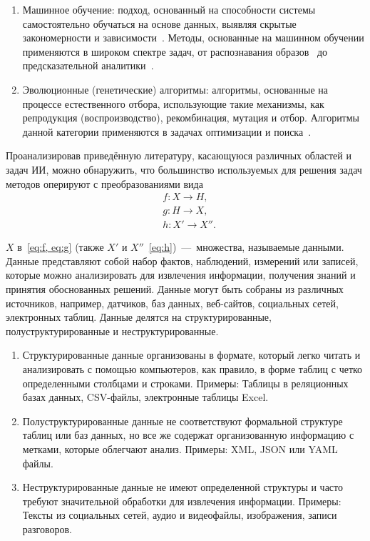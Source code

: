 \begin{itemize}[leftmargin=2.5em, label=\textbullet]
\begin{enumerate}[leftmargin=2.5em]
        \item Машинное обучение: подход, основанный на способности системы самостоятельно обучаться на основе данных, выявляя скрытые закономерности и зависимости~\cite{joshi, brink, vorontsov, wolf, muller, sarkerml}. Методы, основанные на машинном обучении применяются в широком спектре задач, от распознавания образов~\cite{bishop, singh, fieguth, braga-neto} до предсказательной аналитики~\cite{sghir, sharma, manasa, vjugin}.
        \item Эволюционные (генетические) алгоритмы: алгоритмы, основанные на процессе естественного отбора, использующие такие механизмы, как репродукция (воспроизводство), рекомбинация, мутация и отбор. Алгоритмы данной категории применяются в задачах оптимизации и поиска~\cite{alhijawi, katoch, khan, whitley, dejong, fraser1, fraser2, baricelli57, baricelli62}.
    \end{enumerate}
\end{itemize}

Проанализировав приведённую литературу, касающуюся различных областей и задач ИИ, можно обнаружить, что большинство используемых для решения задач методов оперируют с преобразованиями вида\begin{align}
    & f : X \to H, \label{eq:f} \\ 
    & g : H \to X, \label{eq:g} \\
    & h : X' \to X''. \label{eq:h}
\end{align}

$X$ в~\cref{eq:f, eq:g} (также $X'$ и $X''$~\cref{eq:h})~---~множества, называемые данными. Данные представляют собой набор фактов, наблюдений, измерений или записей, которые можно анализировать для извлечения информации, получения знаний и принятия обоснованных решений. Данные могут быть собраны из различных источников, например, датчиков, баз данных, веб-сайтов, социальных сетей, электронных таблиц. Данные делятся на структурированные, полуструктурированные и неструктурированные. \begin{enumerate}
    \item Структурированные данные организованы в формате, который легко читать и анализировать с помощью компьютеров, как правило, в форме таблиц с четко определенными столбцами и строками. Примеры: Таблицы в реляционных базах данных, CSV-файлы, электронные таблицы Excel.
    \item Полуструктурированные данные не соответствуют формальной структуре таблиц или баз данных, но все же содержат организованную информацию с метками, которые облегчают анализ. Примеры: XML, JSON или YAML файлы.
    \item Неструктурированные данные не имеют определенной структуры и часто требуют значительной обработки для извлечения информации. Примеры: Тексты из социальных сетей, аудио и видеофайлы, изображения, записи разговоров.
\end{enumerate}

